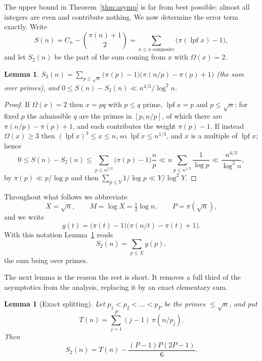 \documentclass[a4paper,11pt,oneside,reqno]{amsart}
\theoremstyle{definition}
\theoremstyle{remark}
\theoremstyle{plain}
\newtheorem{lemma}[definition]{Lemma}
\newcommand{\lpf}{\operatorname{lpf}}
\newcommand{\Om}{\Omega}
\begin{document}
The upper bound in Theorem~\ref{thm:asymp} is far from best possible: almost
all integers are even and contribute nothing. We now determine the error term
exactly. Write
\begin{equation}\label{eq:Sdef}
  S(n) = C_n-\binom{\pi(n)+1}{2}
      =\sum_{x \le n\text{ composite}}\bigl(\pi(\lpf x)-1\bigr),
\end{equation}
and let \(S_2(n)\) be the part of the sum coming from \(x\) with \(\Om(x) = 2\).

\begin{lemma}\label{lem:semiprime}
  \(\displaystyle
    S_2(n) = \sum_{p \le \sqrt n}\bigl(\pi(p)-1\bigr)
             \bigl(\pi(n/p)-\pi(p)+1\bigr)\)
  (the sum over primes), and
  \(0 \le S(n)-S_2(n)\ll n^{4/3}/\log^{2}n\).
\end{lemma}

\begin{proof}
  If \(\Om(x) = 2\) then \(x = pq\) with \(p \le q\) prime, \(\lpf x = p\) and
  \(p \le \sqrt n\); for fixed \(p\) the admissible \(q\) are the primes in
  \([p,n/p]\), of which there are \(\pi(n/p)-\pi(p)+1\), and each contributes
  the weight \(\pi(p)-1\). If instead \(\Om(x) \ge 3\) then
  \((\lpf x)^{3} \le x \le n\), so \(\lpf x \le n^{1/3}\), and \(x\) is a multiple
  of \(\lpf x\); hence
  \[
    0 \le S(n)-S_2(n) \le \sum_{p \le n^{1/3}}\bigl(\pi(p)-1\bigr)\frac{n}{p}
    \ll n\sum_{p \le n^{1/3}}\frac 1{\log p}\ll\frac{n^{4/3}}{\log^{2}n},
  \]
  by \(\pi(p)\ll p/\log p\) and then
  \(\sum_{p \le Y}1/\log p\ll Y/\log^{2}Y\).
\end{proof}

Throughout what follows we abbreviate
\begin{equation}\label{eq:XM}
  X = \sqrt n,\qquad M = \log X = \tfrac{1}{2}\log n,\qquad P = \pi(\sqrt n),
\end{equation}
and we write
\begin{equation}\label{eq:gdef}
  g(t) = \bigl(\pi(t)-1\bigr)\bigl(\pi(n/t)-\pi(t)+1\bigr).
\end{equation}
With this notation Lemma~\ref{lem:semiprime} reads
\begin{equation}\label{eq:S2asg}
  S_2(n) = \sum_{p \le X}g(p),
\end{equation}
the sum being over primes.

The next lemma is the reason the rest is short. It removes a full third of the
asymptotics from the analysis, replacing it by an exact elementary sum.

\begin{lemma}[Exact splitting]\label{lem:split}
  Let \(p_1 < p_2 < \dots < p_P\) be the primes \(\le \sqrt n\), and put
  \[
    T(n) = \sum_{j = 1}^{P}(j-1)\,\pi(n/p_j).
  \]
  Then
  \begin{equation}\label{eq:split-exact}
    S_2(n) = T(n)-\frac{(P-1)P(2P-1)}{6}.
  \end{equation}
\end{lemma}
\end{document}
